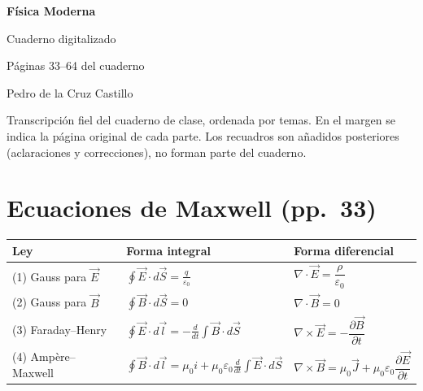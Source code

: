 \documentclass[11pt,a4paper]{article}
\newcommand{\pags}[1]{{\normalfont\small\color{gris}(pp.~#1)}}
\begin{document}
\begin{titlepage}
  \centering
  \vspace*{3cm}
  {\Huge\bfseries\color{azul} Física Moderna\par}
  \vspace{0.6cm}
  {\Large Cuaderno digitalizado\par}
  \vspace{0.4cm}
  {\large Páginas 33–64 del cuaderno\par}
  \vspace{2cm}
  {\large Pedro de la Cruz Castillo\par}
  \vfill
  \begin{minipage}{0.85\textwidth}
  \small
  Transcripción fiel del cuaderno de clase, ordenada por temas. En el margen se indica la
  página original de cada parte. Los recuadros
  son añadidos posteriores (aclaraciones y correcciones), no forman parte del cuaderno.
  \end{minipage}
  \vspace{1.5cm}
\end{titlepage}

\tableofcontents
\newpage
\section{Ecuaciones de Maxwell \pags{33}}

\begin{center}
\renewcommand{\arraystretch}{1.6}
\begin{tabular}{@{}lll@{}}
\toprule
\textbf{Ley} & \textbf{Forma integral} & \textbf{Forma diferencial}\\
\midrule
(1) Gauss para $\vec E$ & $\displaystyle\oint \vec E\cdot d\vec S=\frac{q}{\varepsilon_0}$ & $\nabla\cdot\vec E=\dfrac{\rho}{\varepsilon_0}$\\
(2) Gauss para $\vec B$ & $\displaystyle\oint \vec B\cdot d\vec S=0$ & $\nabla\cdot\vec B=0$\\
(3) Faraday--Henry & $\displaystyle\oint \vec E\cdot d\vec l=-\frac{d}{dt}\int\vec B\cdot d\vec S$ & $\nabla\times\vec E=-\dfrac{\partial\vec B}{\partial t}$\\
(4) Ampère--Maxwell & $\displaystyle\oint \vec B\cdot d\vec l=\mu_0 i+\mu_0\varepsilon_0\frac{d}{dt}\int\vec E\cdot d\vec S$ & $\nabla\times\vec B=\mu_0\vec J+\mu_0\varepsilon_0\dfrac{\partial\vec E}{\partial t}$\\
\bottomrule
\end{tabular}
\end{center}
\end{document}
